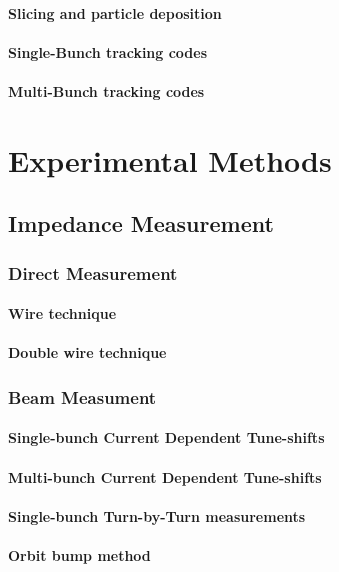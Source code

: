 \documentclass[
	12pt,				%
	openright,			%
	oneside,			%
	a4paper,		%
	chapter=TITLE,		%
	section=TITLE,		%
    brazil,				%
	english,			%
	sumario=tradicional,
	]{abntex2}
\begin{document}
      \subsubsection{Slicing and particle deposition}
      \subsubsection{Single-Bunch tracking codes}
      \subsubsection{Multi-Bunch tracking codes}


\chapter{Experimental Methods}
  \section{Impedance Measurement}
    \subsection{Direct Measurement}
      \subsubsection{Wire technique}
      \subsubsection{Double wire technique}
    \subsection{Beam Measument}
      \subsubsection{Single-bunch Current Dependent Tune-shifts}
      \subsubsection{Multi-bunch Current Dependent Tune-shifts}
      \subsubsection{Single-bunch Turn-by-Turn measurements}
      \subsubsection{Orbit bump method}
\end{document}
